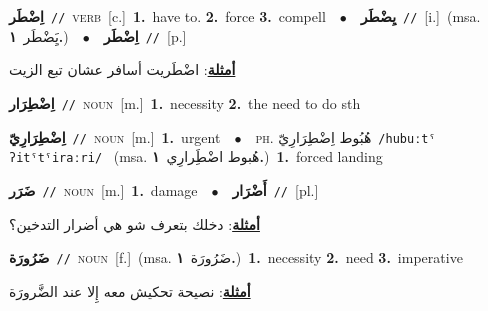 \documentclass[10pt,a4paper,twoside]{article} %
\begin{document}
\begin{multicols}{2}
{{{{{{{{{{{{\setlength\topsep{0pt}\textbf{\foreignlanguage{arabic}{اِضْطَر}}\ {\color{gray}\texttt{//}\color{black}}\ \textsc{verb}\ [c.]\ \textbf{1.}~have to.  \textbf{2.}~force  \textbf{3.}~compell\ \ $\bullet$\ \ \setlength\topsep{0pt}\textbf{\foreignlanguage{arabic}{يِضْطَر}}\ {\color{gray}\texttt{//}\color{black}}\ [i.]\ \color{gray}(msa. \foreignlanguage{arabic}{يَِضْطَر}~\foreignlanguage{arabic}{\textbf{١.}})\color{black}\ \ $\bullet$\ \ \setlength\topsep{0pt}\textbf{\foreignlanguage{arabic}{اِضْطَر}}\ {\color{gray}\texttt{//}\color{black}}\ [p.]\  \begin{flushright}\color{gray}\foreignlanguage{arabic}{\textbf{\underline{\foreignlanguage{arabic}{أمثلة}}}: اضْطَريت أسافر عشان تبع الزيت}\end{flushright}\color{black}} \vspace{2mm}

{\setlength\topsep{0pt}\textbf{\foreignlanguage{arabic}{اِضْطِرَار}}\ {\color{gray}\texttt{//}\color{black}}\ \textsc{noun}\ [m.]\ \textbf{1.}~necessity  \textbf{2.}~the need to do sth\ 

{\setlength\topsep{0pt}\textbf{\foreignlanguage{arabic}{اِضْطِرَارِيّ}}\ {\color{gray}\texttt{//}\color{black}}\ \textsc{noun}\ [m.]\ \textbf{1.}~urgent\ \ $\bullet$\ \ \textsc{ph.} \color{gray} \foreignlanguage{arabic}{هُبُوط اِضْطِرَارِيّ}\color{black}\ {\color{gray}\texttt{/{\sffamily hubuːtˤ ʔitˤtˤiraːri}/}\color{black}}\ \color{gray} (msa. \foreignlanguage{arabic}{هُبوط اضْطَِرارِي}~\foreignlanguage{arabic}{\textbf{١.}})\color{black}\ \textbf{1.}~forced landing\ 

{\setlength\topsep{0pt}\textbf{\foreignlanguage{arabic}{ضَرَر}}\ {\color{gray}\texttt{//}\color{black}}\ \textsc{noun}\ [m.]\ \textbf{1.}~damage\ \ $\bullet$\ \ \setlength\topsep{0pt}\textbf{\foreignlanguage{arabic}{أَضْرَار}}\ {\color{gray}\texttt{//}\color{black}}\ [pl.]\  \begin{flushright}\color{gray}\foreignlanguage{arabic}{\textbf{\underline{\foreignlanguage{arabic}{أمثلة}}}: دخلك بتعرف شو هي أضرار التدخين؟}\end{flushright}\color{black}} \vspace{2mm}

{\setlength\topsep{0pt}\textbf{\foreignlanguage{arabic}{ضَرُورَة}}\ {\color{gray}\texttt{//}\color{black}}\ \textsc{noun}\ [f.]\ \color{gray}(msa. \foreignlanguage{arabic}{ضَرُورَة}~\foreignlanguage{arabic}{\textbf{١.}})\color{black}\ \textbf{1.}~necessity  \textbf{2.}~need  \textbf{3.}~imperative\  \begin{flushright}\color{gray}\foreignlanguage{arabic}{\textbf{\underline{\foreignlanguage{arabic}{أمثلة}}}: نصيحة تحكيش معه إِلا عند الضَّرورَة}\end{flushright}\color{black}} \vspace{2mm}

}}}}}}}}}}}}}
\end{multicols}
\end{document}
